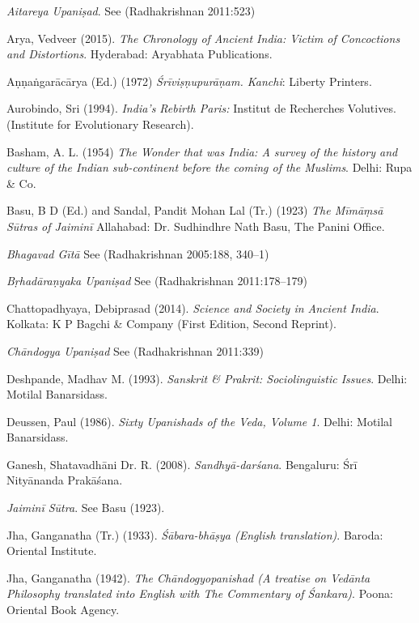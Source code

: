 \begin{thebibliography}{99}
\itemsep=2pt
{{\sl Aitareya Upaniṣad}}. See (Radhakrishnan 2011:523)

Arya, Vedveer (2015). {\sl The Chronology of Ancient India: Victim of Concoctions and Distortions}. Hyderabad: Aryabhata Publications.

Aṇṇaṅgarācārya (Ed.) (1972) {\sl Śrīviṣṇupurāṇam. Kanchi}: Liberty Printers. 

Aurobindo, Sri (1994). {\sl India’s Rebirth Paris:} Institut de Recherches Volutives. (Institute for Evolutionary Research).

Basham, A. L. (1954) {\sl The Wonder that was India: A survey of the history and culture of the Indian sub-continent before the coming of the Muslims}. Delhi: Rupa \& Co.

Basu, B D (Ed.) and Sandal, Pandit Mohan Lal (Tr.) (1923) {\sl The Mīmāṃsā Sūtras of Jaiminī} Allahabad: Dr. Sudhindhre Nath Basu, The Panini Office.

{\sl Bhagavad Gītā} See (Radhakrishnan 2005:188, 340--1)

{\sl Bṛhadāraṇyaka Upaniṣad} See (Radhakrishnan 2011:178--179)

Chattopadhyaya, Debiprasad (2014). {\sl Science and Society in Ancient India}. Kolkata: K P Bagchi \& Company (First Edition, Second Reprint).

{\sl Chāndogya Upaniṣad} See (Radhakrishnan 2011:339)

Deshpande, Madhav M. (1993). {\sl Sanskrit \& Prakrit: Sociolinguistic Issues}. Delhi: Motilal Banarsidass.

Deussen, Paul (1986). {\sl Sixty Upanishads of the Veda, Volume 1}. Delhi: Motilal Banarsidass.

Ganesh, Shatavadhāni Dr. R. (2008). {\sl Sandhyā-darśana}. Bengaluru: Śrī Nityānanda Prakāśana.

{\sl Jaiminī Sūtra}. See Basu (1923).

Jha, Ganganatha (Tr.) (1933). {\sl Śābara-bhāṣya (English translation)}. Baroda: Oriental Institute.

Jha, Ganganatha (1942). {\sl The Chāndogyopanishad (A treatise on Vedānta Philosophy translated into English with The Commentary of Śankara)}. Poona: Oriental Book Agency.


\end{thebibliography}
